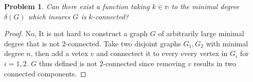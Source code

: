 \documentclass{article}
\newtheorem{prb}{Problem}
\begin{document}
\begin{prb} 
	Can there exist a function taking $k \in \mathbb{n}$ to the minimal degree $\delta(G)$ which insures $G$ is $k$-connected? 
\end{prb} 

\begin{proof} 
No, It is not hard to construct a graph $G$ of arbitrarily large minimal degree that is not $2$-connected. Take two disjoint graphs $G_1, G_2$ with minimal degree $n$, then add a vetex $v$ and connectect it to every every vertex in $G_i$ for $i = 1, 2$. $G$ thus defined is not $2$-connected since removing $v$ results in two connected components.  
\end{proof}
\end{document}
